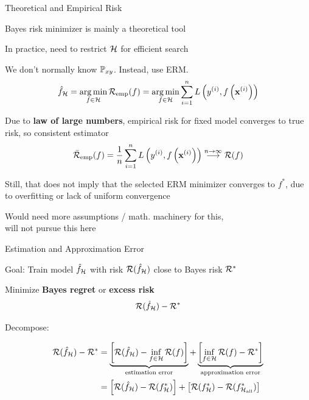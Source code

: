 \documentclass[11pt,compress,t,notes=noshow, xcolor=table]{beamer}
\begin{document}
\begin{framei}[sep=M]{Theoretical and Empirical Risk}  
 
\item Bayes risk minimizer is mainly a theoretical tool
\item In practice, need to restrict $\mathcal{H}$ for efficient search
\item We don't normally know $\mathbb{P}_{xy}$. Instead, use ERM. 
$$
{\hat f}_{\mathcal{H}} = \operatorname*{arg\,min}_{f \in \mathcal{H}} \mathcal{R}_{\text{emp}}(f) = \operatorname*{arg\,min}_{f \in \mathcal{H}} \sum\limits_{i=1}^n L\left(y^{(i)}, f\left(\mathbf{x}^{(i)}\right)\right)
$$
\item Due to \textbf{law of large numbers}, empirical risk for fixed model converges to true risk, so consistent estimator
$$
\bar{\mathcal{R}}_{\text{emp}}(f) = \frac{1}{n} \sum\limits_{i=1}^n L\left(y^{(i)}, f\left(\mathbf{x}^{(i)}\right)\right) \overset{n \to \infty}{\longrightarrow} \mathcal{R}(f) 
$$
\item Still, that does not imply that the selected ERM minimizer converges to $f^{\ast}$, due to overfitting or lack of uniform convergence 
\item Would need more assumptions / math. machinery for this, \\
will not pursue this here 

\end{framei}



\begin{framei}[sep=L]{Estimation and Approximation Error} 

\item Goal: Train model $\hat f_{\mathcal{H}}$ with risk $\mathcal{R}(\hat f_{\mathcal{H}})$ close to Bayes risk $\mathcal{R}^\ast$ \\
\item Minimize \textbf{Bayes regret} or \textbf{excess risk}
$$
\mathcal{R}(\hat f_{\mathcal{H}}) - \mathcal{R}^\ast
$$ 

\item Decompose: 

\begin{align*}
\mathcal{R}(\hat f_{\mathcal{H}}) - \mathcal{R}^\ast &= \underbrace{\left[\mathcal{R}(\hat f_{\mathcal{H}}) - \inf_{f \in \mathcal{H}} \mathcal{R}(f)\right]}_{\text{estimation error}} + \underbrace{\left[\inf_{f \in \mathcal{H}} \mathcal{R}(f) - \mathcal{R}^\ast\right]}_{\text{approximation error}} \\
&= \left[\mathcal{R}(\hat{f}_{\mathcal{H}}) - \mathcal{R}(f^{\ast}_{\mathcal{H}})\right] + \left[\mathcal{R}(f^{\ast}_{\mathcal{H}}) - \mathcal{R}(f^{\ast}_{\mathcal{H}_{\text{all}}}) \right] 
\end{align*}

\end{framei}
\end{document}

